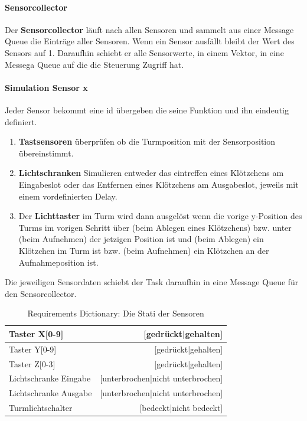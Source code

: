 \paragraph{Sensorcollector}
Der \textbf{Sensorcollector} läuft nach allen Sensoren und sammelt  aus einer Message Queue die Einträge aller Sensoren. Wenn ein Sensor ausfällt bleibt der Wert des Sensors auf 1. Daraufhin schiebt er alle Sensorwerte, in einem Vektor, in eine Messega Queue auf die die Steuerung Zugriff hat.

\paragraph{Simulation Sensor x}
Jeder Sensor bekommt eine id übergeben die seine Funktion und ihn eindeutig definiert. 
\begin{enumerate}
\item \textbf{Tastsensoren} überprüfen ob die Turmposition mit der Sensorposition übereinstimmt.
\item \textbf{Lichtschranken} Simulieren entweder das eintreffen eines Klötzchens am Eingabeslot oder das Entfernen eines Klötzchens am Ausgabeslot, jeweils mit einem vordefinierten Delay. 
\item Der \textbf{Lichttaster} im Turm wird dann ausgelöst wenn die vorige y-Position des Turms im vorigen Schritt über (beim Ablegen eines Klötzchens) bzw. unter (beim Aufnehmen) der jetzigen Position ist und (beim Ablegen) ein Klötzchen im Turm ist bzw. (beim Aufnehmen) ein Klötzchen an der Aufnahmeposition ist.
\end{enumerate}
Die jeweiligen Sensordaten schiebt der Task daraufhin in eine Message Queue für den Sensorcollector.
\begin{table}[h]
\centering
\begin{tabular}{|l|r|}
\hline
Taster X[0-9] &  [gedrückt|gehalten] \\
\hline
Taster Y[0-9] &  [gedrückt|gehalten] \\
\hline
Taster Z[0-3] &  [gedrückt|gehalten] \\
\hline
Lichtschranke Eingabe & [unterbrochen|nicht unterbrochen] \\
\hline
Lichtschranke Ausgabe & [unterbrochen|nicht unterbrochen] \\
\hline
Turmlichtschalter & [bedeckt|nicht bedeckt]\\
\hline
\end{tabular}
\caption{Requirements Dictionary: Die Stati der Sensoren}
\label{tab:Requirements Dictionary}
\end{table}
